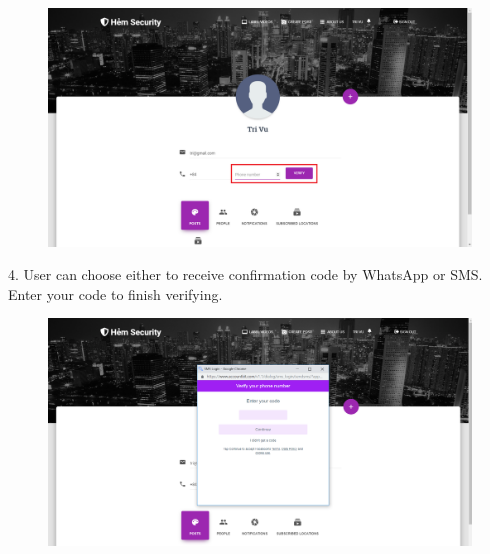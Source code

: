 \begin{center}
    \begin{figure}[H]
    \centering
    \includegraphics[width=1\columnwidth]{images/chap6/instruction3.png}
    \end{figure}
\end{center}
4. User can choose either to receive confirmation code by WhatsApp or SMS. Enter your code to finish verifying.
\begin{center}
    \begin{figure}[H]
    \centering
    \includegraphics[width=1\columnwidth]{images/chap6/instruction4.png}
    \end{figure}
\end{center}
